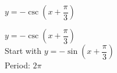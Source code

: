 {$y = -\csc \left( x + \dfrac{\pi}{3} \right)$}
{$y = -\csc \left( x + \dfrac{\pi}{3} \right)$\\
Start with $y = -\sin \left( x + \dfrac{\pi}{3} \right)$\\
Period: $2\pi$

\begin{center}
\end{center}
}
